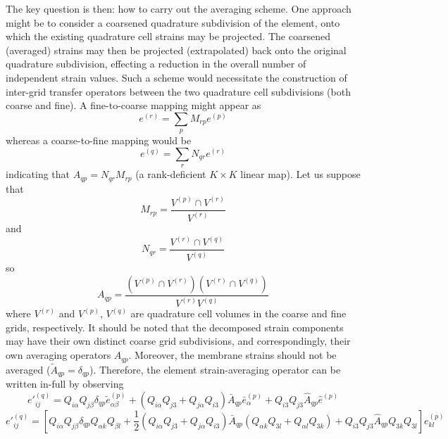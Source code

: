 \documentclass[11pt]{article} %
\begin{document}
The key question is then: how to carry out the averaging scheme. One approach might be to consider a coarsened quadrature subdivision of the element, onto which the existing quadrature cell strains may be projected. The coarsened (averaged) strains may then be projected (extrapolated) back onto the original quadrature subdivision, effecting a reduction in the overall number of independent strain values. Such a scheme would necessitate the construction of inter-grid transfer operators between the two quadrature cell subdivisions (both coarse and fine). A fine-to-coarse mapping might appear as
\begin{equation}
	e^{(r)} = \sum_p M_{rp} e^{(p)}
\end{equation}
whereas a coarse-to-fine mapping would be
\begin{equation}
	e^{(q)} = \sum_r N_{qr} e^{(r)}
\end{equation}
indicating that $A_{qp} = N_{qr} M_{rp}$ (a rank-deficient $K \times K$ linear map). Let us suppose that
\begin{equation}
	M_{rp} = \frac{V^{(p)} \cap V^{(r)}}{V^{(r)}}
\end{equation}
and
\begin{equation}
	N_{qr} = \frac{V^{(r)} \cap V^{(q)}}{V^{(q)}}
\end{equation}
so
\begin{equation}
	A_{qp} = \frac{(V^{(p)} \cap V^{(r)}) (V^{(r)} \cap V^{(q)})}{V^{(r)} V^{(q)}}
\end{equation}
where $V^{(r)}$ and $V^{(p)}$, $V^{(q)}$ are quadrature cell volumes in the coarse and fine grids, respectively. It should be noted that the decomposed strain components may have their own distinct coarse grid subdivisions, and correspondingly, their own averaging operators $A_{qp}$. Moreover, the membrane strains should not be averaged ($\tilde{A}_{qp} = \delta_{qp}$). Therefore, the element strain-averaging operator can be written in-full by observing
\begin{equation}
	e'^{(q)}_{ij} = Q_{i \alpha} Q_{j \beta} \delta_{qp} \tilde{e}^{(p)}_{\alpha \beta} + (Q_{i \alpha} Q_{j 3} + Q_{j \alpha} Q_{i 3}) \bar{A}_{qp} \bar{e}^{(p)}_{\alpha} + Q_{i 3} Q_{j 3} \hat{A}_{qp} \hat{e}^{(p)}
\end{equation}
\begin{equation}
	e'^{(q)}_{ij} = \left[ Q_{i \alpha} Q_{j \beta} \delta_{qp} Q_{\alpha k} Q_{\beta l} + \frac{1}{2} (Q_{i \alpha} Q_{j 3} + Q_{j \alpha} Q_{i 3}) \bar{A}_{qp} (Q_{\alpha k} Q_{3 l} + Q_{\alpha l} Q_{3 k}) + Q_{i 3} Q_{j 3} \hat{A}_{qp} Q_{3 k} Q_{3 l} \right] e_{kl}^{(p)}
\end{equation}
\end{document}
